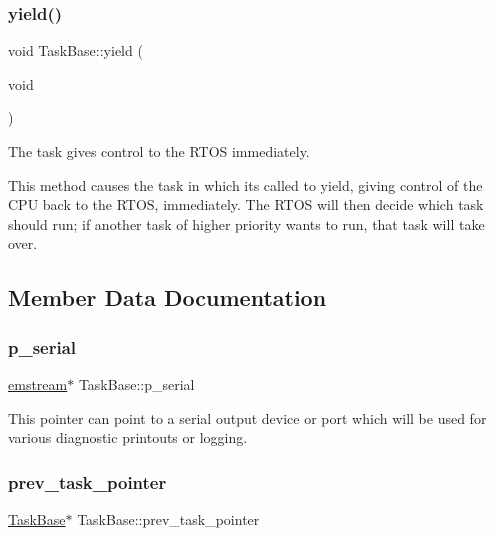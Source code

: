 \subsubsection{\texorpdfstring{yield()}{yield()}}
{\footnotesize\ttfamily void Task\+Base\+::yield (\begin{DoxyParamCaption}\item[{void}]{ }\end{DoxyParamCaption})\hspace{0.3cm}{\ttfamily [inline]}}



The task gives control to the R\+T\+OS immediately. 

This method causes the task in which it\textquotesingle{}s called to yield, giving control of the C\+PU back to the R\+T\+OS, immediately. The R\+T\+OS will then decide which task should run; if another task of higher priority wants to run, that task will take over. 

\subsection{Member Data Documentation}
\mbox{\label{class_task_base_a5299f7fa222eb0ddac3b77e667170fd7}} 
\subsubsection{\texorpdfstring{p\+\_\+serial}{p\_serial}}
{\footnotesize\ttfamily \mbox{\hyperlink{classemstream}{emstream}}$\ast$ Task\+Base\+::p\+\_\+serial\hspace{0.3cm}{\ttfamily [protected]}}

This pointer can point to a serial output device or port which will be used for various diagnostic printouts or logging. \mbox{\label{class_task_base_a4f8adbe534975ada5ffb46fa403ef07f}} 
\subsubsection{\texorpdfstring{prev\+\_\+task\+\_\+pointer}{prev\_task\_pointer}}
{\footnotesize\ttfamily \mbox{\hyperlink{class_task_base}{Task\+Base}}$\ast$ Task\+Base\+::prev\+\_\+task\+\_\+pointer\hspace{0.3cm}{\ttfamily [protected]}}


